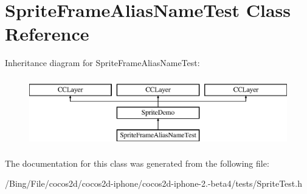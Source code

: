 \hypertarget{interface_sprite_frame_alias_name_test}{\section{Sprite\-Frame\-Alias\-Name\-Test Class Reference}
\label{interface_sprite_frame_alias_name_test}
}
Inheritance diagram for Sprite\-Frame\-Alias\-Name\-Test\-:\begin{figure}[H]
\begin{center}
\leavevmode
\includegraphics[height=3.000000cm]{interface_sprite_frame_alias_name_test}
\end{center}
\end{figure}


The documentation for this class was generated from the following file\-:\begin{DoxyCompactItemize}
\item 
/\-Bing/\-File/cocos2d/cocos2d-\/iphone/cocos2d-\/iphone-\/2.-\/beta4/tests/Sprite\-Test.\-h\end{DoxyCompactItemize}
